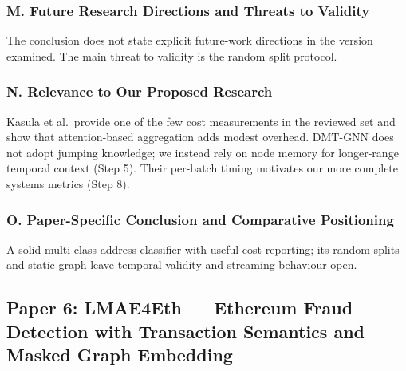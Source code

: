 \documentclass[11pt,a4paper]{article}
\begin{document}
\subsubsection*{M. Future Research Directions and Threats to Validity}
The conclusion does not state explicit future-work directions in the version examined. The main threat to validity is the random split protocol.

\subsubsection*{N. Relevance to Our Proposed Research}
Kasula et al.\ provide one of the few cost measurements in the reviewed set and show that attention-based aggregation adds modest overhead. DMT-GNN does not adopt jumping knowledge; we instead rely on node memory for longer-range temporal context (Step 5). Their per-batch timing motivates our more complete systems metrics (Step 8).

\subsubsection*{O. Paper-Specific Conclusion and Comparative Positioning}
A solid multi-class address classifier with useful cost reporting; its random splits and static graph leave temporal validity and streaming behaviour open.

\subsection{Paper 6: LMAE4Eth --- Ethereum Fraud Detection with Transaction Semantics and Masked Graph Embedding}
\label{sec:p6_lmae4eth}
\end{document}
